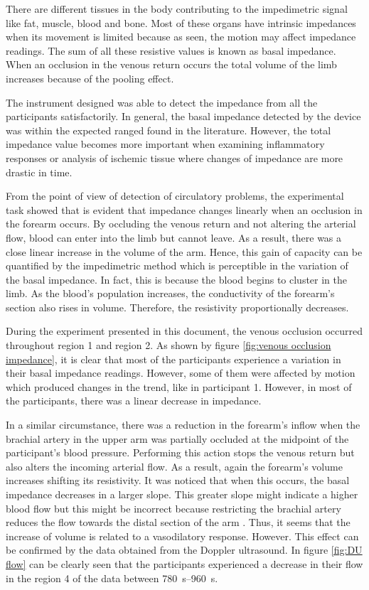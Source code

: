 There are different tissues in the body contributing to the impedimetric signal like fat, muscle, blood and bone. Most of these organs have intrinsic impedances when its movement is limited because as seen, the motion may affect impedance readings. The sum of all these resistive values is known as basal impedance. When an occlusion in the venous return occurs the total volume of the limb increases because of the pooling effect.

The instrument designed was able to detect the impedance from all the participants satisfactorily. In general, the basal impedance detected by the device was within the expected ranged found in the literature. However, the total impedance value becomes more important when examining inflammatory responses or analysis of ischemic tissue  where changes of impedance are more drastic in time. 

From the point of view of detection of circulatory problems, the experimental task showed that is evident that impedance changes linearly when an occlusion in the forearm occurs. By occluding the venous return and not altering the arterial flow, blood can enter into the limb but cannot leave. As a result, there was a close linear increase in the volume of the arm. Hence, this gain of capacity can be quantified by the impedimetric method which is perceptible in the variation of the basal impedance. In fact, this is because the blood begins to cluster in the limb. As the blood's population increases, the conductivity of the forearm's section also rises in volume. Therefore, the resistivity proportionally decreases.

During the experiment presented in this document, the venous occlusion occurred throughout region 1 and region 2. As shown by figure \ref{fig:venous occlusion impedance}, it is clear that most of the participants experience a variation in their basal impedance readings. However, some of them were affected by motion which produced changes in the trend, like in participant 1. However, in most of the participants, there was a linear decrease in impedance. 

In a similar circumstance, there was a reduction in the forearm's inflow when the brachial artery in the upper arm was partially occluded at the midpoint of the participant's blood pressure. Performing this action stops the venous return but also alters the incoming arterial flow. As a result, again the forearm's volume increases shifting its resistivity. It was noticed that when this occurs, the basal impedance decreases in a larger slope. This greater slope might indicate a higher blood flow but this might be incorrect because restricting the brachial artery reduces the flow towards the distal section of the arm \cite{mccully2004muscle}. Thus, it seems that the increase of volume is related to a vasodilatory response. However. This effect can be confirmed by the data obtained from the Doppler ultrasound. In figure \ref{fig:DU flow} can be clearly seen that the participants experienced a decrease in their flow in the region 4 of the data between \SIrange{780}{960}{\second}.

